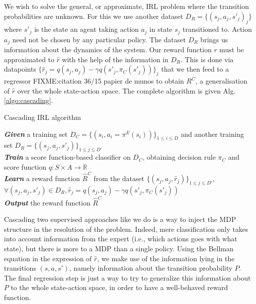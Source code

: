 \documentclass[smallextended]{svjour3}
\begin{document}
We wish to solve the general, or approximate, IRL problem where the transition probabilities are unknown. For this we use another dataset $D_R = \{(s_j,a_j,s'_j)_j\}$ where $s'_j$ is the state an agent taking action $a_j$ in state $s_j$ transitioned to. Action $a_j$ need not be chosen by any particular policy. The dataset $D_R$ brings us information about the dynamics of the system. Our reward function $r$ must be approximated to $\hat r$ with the help of the information in $D_R$. This is done via datapoints $\{\hat r_j = q(s_j,a_j) - \gamma q(s'_j,\pi_C(s'_j))\}_j$ that we then feed to a regressor FIXME:citation 36/15 papier de munos to obtain $R^C$, a generalisation of $\hat r$ over the whole state-action space. The complete algorithm is given Alg. \ref{algo:cascading}.
\begin{algorithm}%
  \caption{Cascading IRL algorithm}
  \label{algo:cascading}
  \emph{\textbf{Given}} a training set $D_C=\{(s_i,a_i=\pi^E(s_i))\}_{1\leq i \leq D}$ and another training set $D_R=\{(s_{j},a_{j},s'_{j})\}_{1\leq j \leq D'}$\;\\
  \emph{\textbf{Train}} a score function-based classifier on $D_C$, obtaining decision rule $\pi_C$ and score function $q:S\times A \rightarrow \mathbb R$\;\\
  \emph{\textbf{Learn}} a reward function $\hat R^C$ from the dataset $\{(s_{j},a_{j},\hat{r}_j)\}_{1\leq j \leq D'}$, $\forall (s_j,a_j,s'_j) \in D_R,\hat{r}_j=q(s_{j},a_{j})-\gamma q(s'_{j},\pi_C(s'_{j}))$\;\\
  \emph{\textbf{Output}} the reward function $\hat R^{C}$ \;
\end{algorithm}

Cascading two supervised approaches like we do is a way to inject the MDP structure in the resolution of the problem. Indeed, mere classification only takes into account information from the expert (i.e., which actions goes with what state), but there is more to a MDP than a single policy. Using the Bellman equation in the expression of $\hat r$, we make use of the information lying in the transitions $(s,a,s')$, namely information about the transition probability $P$. The final regression step is just a way to try to generalize this information about $P$ to the whole state-action space, in order to have a well-behaved reward function.
\end{document}
